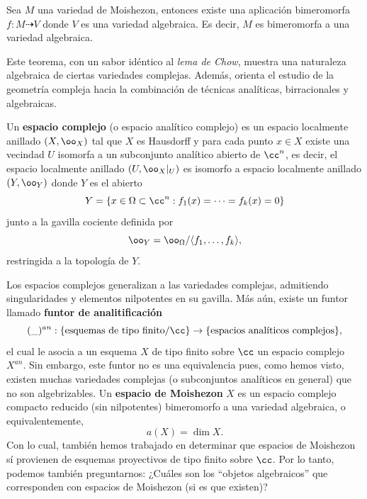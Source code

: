 \begin{theorem}[de Moishezon]\parencite{Moishezonlemmachow}
	Sea $M$ una variedad de Moishezon, entonces existe una aplicación bimeromorfa $f:M\dashrightarrow V$ donde $V$ es una variedad algebraica. Es decir, $M$ es bimeromorfa a una variedad algebraica.
\end{theorem}

Este teorema, con un sabor idéntico al \textit{lema de Chow}, muestra una naturaleza algebraica de ciertas variedades complejas. Además, orienta el estudio de la geometría compleja hacia la combinación de técnicas analíticas, birracionales y algebraicas. 

\begin{remark}\parencite[Chap. VII, Sec. 6.4]{grauertremment}\label{espaciosdemoishezon}
	Un \textbf{espacio complejo} (o espacio analítico complejo) es un espacio localmente anillado $(X,\oo_X)$ tal que $X$ es Hausdorff y para cada punto $x\in X$ existe una vecindad $U$ isomorfa a un subconjunto analítico abierto de $\cc^n$, es decir, el espacio localmente anillado $(U,\oo_X|_U)$ es isomorfo a espacio localmente anillado $(Y,\oo_Y)$ donde $Y$ es el abierto
	\begin{equation*}
		Y=\{x\in \Omega\subset\cc^n:f_1(x)=\cdots=f_k(x)=0\}
	\end{equation*}
	junto a la gavilla cociente definida por
	\begin{equation*}
		\oo_Y=\oo_\Omega/\langle f_1,\dots, f_k\rangle,
	\end{equation*}
	restringida a la topología de $Y$.
	
	Los espacios complejos generalizan a las variedades complejas, admitiendo singularidades y elementos nilpotentes en su gavilla. Más aún, existe un funtor llamado \textbf{funtor de analitificación}
	\begin{equation*}
		(\_)^{an}:\{\text{esquemas de tipo finito}/\cc\}\to\{\text{espacios analíticos complejos}\},
	\end{equation*}
	el cual le asocia a un esquema $X$ de tipo finito sobre $\cc$ un espacio complejo $X^{an}$. Sin embargo, este funtor no es una equivalencia pues, como hemos visto, existen muchas variedades complejas (o subconjuntos analíticos en general) que no son algebrizables. Un \textbf{espacio de Moishezon} $X$ es un espacio complejo compacto reducido (sin nilpotentes) bimeromorfo a una variedad algebraica, o equivalentemente,
	\begin{equation*}
		a(X)=\dim X.
	\end{equation*}
	Con lo cual, también hemos trabajado en determinar que espacios de Moishezon sí provienen de esquemas proyectivos de tipo finito sobre $\cc$. Por lo tanto, podemos también preguntarnos: ¿Cuáles son los \enquote{objetos algebraicos} que corresponden con espacios de Moishezon (si es que existen)?
	\end{remark}

